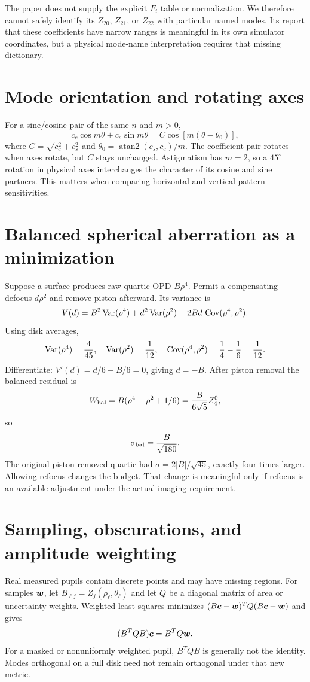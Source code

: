 The paper does not supply the explicit $F_i$ table or normalization.
We therefore cannot safely identify its $Z_{20}$, $Z_{21}$, or $Z_{22}$
with particular named modes. Its report that these coefficients have
narrow ranges is meaningful in its own simulator coordinates, but a
physical mode-name interpretation requires that missing dictionary.

\section{Mode orientation and rotating axes}
For a sine/cosine pair of the same $n$ and $m>0$,
\[
c_c\cos m\theta+c_s\sin m\theta
=C\cos[m(\theta-\theta_0)],
\]
where
$C=\sqrt{c_c^2+c_s^2}$ and
$\theta_0=\operatorname{atan2}(c_s,c_c)/m$.
The coefficient pair rotates when axes rotate, but $C$ stays unchanged.
Astigmatism has $m=2$, so a $45^\circ$ rotation in physical axes
interchanges the character of its cosine and sine partners.
This matters when comparing horizontal and vertical pattern sensitivities.

\section{Balanced spherical aberration as a minimization}
Suppose a surface produces raw quartic OPD $B\rho^4$. Permit a compensating
defocus $d\rho^2$ and remove piston afterward. Its variance is
\[
V(d)=B^2\operatorname{Var}(\rho^4)+d^2\operatorname{Var}(\rho^2)
+2Bd\,\operatorname{Cov}(\rho^4,\rho^2).
\]
Using disk averages,
\[
\operatorname{Var}(\rho^4)=\frac4{45},\quad
\operatorname{Var}(\rho^2)=\frac1{12},\quad
\operatorname{Cov}(\rho^4,\rho^2)=\frac14-\frac16=\frac1{12}.
\]
Differentiate:
$V'(d)=d/6+B/6=0$, giving $d=-B$.
After piston removal the balanced residual is
\[
W_{\rm bal}=B(\rho^4-\rho^2+1/6)
=\frac{B}{6\sqrt5}Z_4^0,
\]
so
\begin{equation}
\sigma_{\rm bal}=\frac{|B|}{\sqrt{180}}.
\end{equation}
The original piston-removed quartic had
$\sigma=2|B|/\sqrt{45}$, exactly four times larger.
Allowing refocus changes the budget. That change is meaningful only
if refocus is an available adjustment under the actual imaging requirement.

\section{Sampling, obscurations, and amplitude weighting}
Real measured pupils contain discrete points and may have missing regions.
For samples $\bm{w}$, let $B_{\ell j}=Z_j(\rho_\ell,\theta_\ell)$ and
let $Q$ be a diagonal matrix of area or uncertainty weights.
Weighted least squares minimizes
$(B\bm{c}-\bm{w})^TQ(B\bm{c}-\bm{w})$ and gives
\begin{equation}
(B^TQB)\bm{c}=B^TQ\bm{w}.
\label{eq:modalfit}
\end{equation}
For a masked or nonuniformly weighted pupil, $B^TQB$ is generally not
the identity. Modes orthogonal on a full disk need not remain orthogonal
under that new metric.

